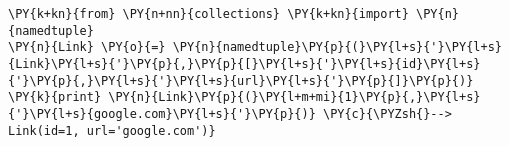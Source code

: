 \begin{Verbatim}[commandchars=\\\{\}]
\PY{k+kn}{from} \PY{n+nn}{collections} \PY{k+kn}{import} \PY{n}{namedtuple}
\PY{n}{Link} \PY{o}{=} \PY{n}{namedtuple}\PY{p}{(}\PY{l+s}{'}\PY{l+s}{Link}\PY{l+s}{'}\PY{p}{,}\PY{p}{[}\PY{l+s}{'}\PY{l+s}{id}\PY{l+s}{'}\PY{p}{,}\PY{l+s}{'}\PY{l+s}{url}\PY{l+s}{'}\PY{p}{]}\PY{p}{)}
\PY{k}{print} \PY{n}{Link}\PY{p}{(}\PY{l+m+mi}{1}\PY{p}{,}\PY{l+s}{'}\PY{l+s}{google.com}\PY{l+s}{'}\PY{p}{)} \PY{c}{\PYZsh{}--> Link(id=1, url='google.com')}
\end{Verbatim}
